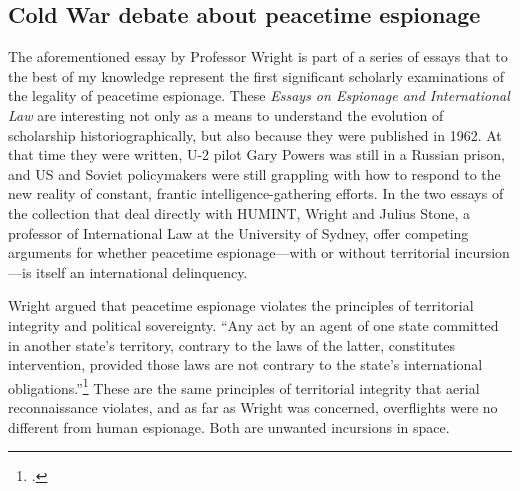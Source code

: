 \documentclass{memoir}
\begin{document}
\begin{refsegment}
\subsection{Cold War debate about peacetime espionage}
The aforementioned essay by Professor Wright is part of a series of essays that to the best of my knowledge represent the first significant scholarly examinations of the legality of peacetime espionage. These \emph{Essays on Espionage and International Law} are interesting not only as a means to understand the evolution of scholarship historiographically, but also because they were published in 1962. At that time they were written, U-2 pilot Gary Powers was still in a Russian prison, and US and Soviet policymakers were still grappling with how to respond to the new reality of constant, frantic intelligence-gathering efforts. In the two essays of the collection that deal directly with HUMINT, Wright and Julius Stone, a professor of International Law at the University of Sydney, offer competing arguments for whether peacetime espionage---with or without territorial incursion---is itself an international delinquency.

Wright argued that peacetime espionage violates the principles of territorial integrity and political sovereignty. ``Any act by an agent of one state committed in another state's territory, contrary to the laws of the latter, constitutes intervention, provided those laws are not contrary to the state's international obligations.''\footcite[p.~13]{wright_espionage_1962} These are the same principles of territorial integrity that aerial reconnaissance violates, and as far as Wright was concerned, overflights were no different from human espionage. Both are unwanted incursions in space.


\end{refsegment}
\end{document}

